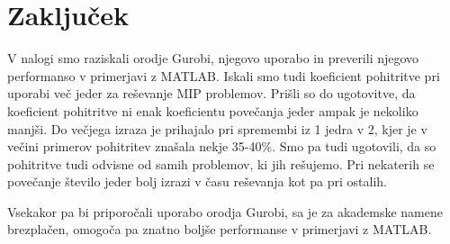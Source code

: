 \documentclass[a4paper,11pt]{article}
\begin{document}
\section{Zaključek}
V nalogi smo raziskali orodje Gurobi, njegovo uporabo in preverili njegovo performanso v primerjavi z MATLAB. Iskali smo tudi koeficient pohitritve pri uporabi več jeder za reševanje MIP problemov. Prišli so do ugotovitve, da koeficient pohitritve ni enak koeficientu povečanja jeder ampak je nekoliko manjši. Do večjega izraza je prihajalo pri spremembi iz 1 jedra v 2, kjer je v večini primerov pohitritev znašala nekje 35-40\%. Smo pa tudi ugotovili, da so pohitritve tudi odvisne od samih problemov, ki jih rešujemo. Pri nekaterih se povečanje število jeder bolj izrazi v času reševanja kot pa pri ostalih.

Vsekakor pa bi priporočali uporabo orodja Gurobi, sa je za akademske namene brezplačen, omogoča pa znatno boljše performanse v primerjavi z MATLAB.



\end{document}

